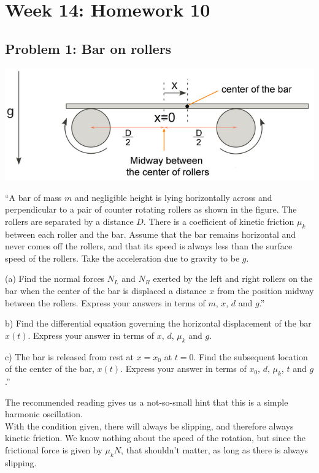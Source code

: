 \documentclass[8.01x]{subfiles}
\begin{document}
\chapter{Week 14: Homework 10}

\section{Problem 1: Bar on rollers}

\begin{center}
\includegraphics[scale=0.7]{Graphics/h10p1}
\end{center}

``A bar of mass $m$ and negligible height is lying horizontally across and perpendicular to a pair of counter rotating rollers as shown in the figure. The rollers are separated by a distance $D$. There is a coefficient of kinetic friction $\mu_k$ between each roller and the bar. Assume that the bar remains horizontal and never comes off the rollers, and that its speed is always less than the surface speed of the rollers. Take the acceleration due to gravity to be $g$.

(a) Find the normal forces $N_L$ and $N_R$ exerted by the left and right rollers on the bar when the center of the bar is displaced a distance $x$ from the position midway between the rollers. Express your answers in terms of $m$, $x$, $d$ and $g$.''

b) Find the differential equation governing the horizontal displacement of the bar $x(t)$. Express your answer in terms of $x$, $d$, $\mu_k$ and $g$.

c) The bar is released from rest at $x = x_0$ at $t = 0$. Find the subsequent location of the center of the bar, $x(t)$. Express your answer in terms of $x_0$, $d$, $\mu_k$, $t$ and $g$.''

The recommended reading gives us a not-so-small hint that this is a simple harmonic oscillation.\\
With the condition given, there will always be slipping, and therefore always kinetic friction. We know nothing about the speed of the rotation, but since the frictional force is given by $\mu_k N$, that shouldn't matter, as long as there is always slipping.
\end{document}
